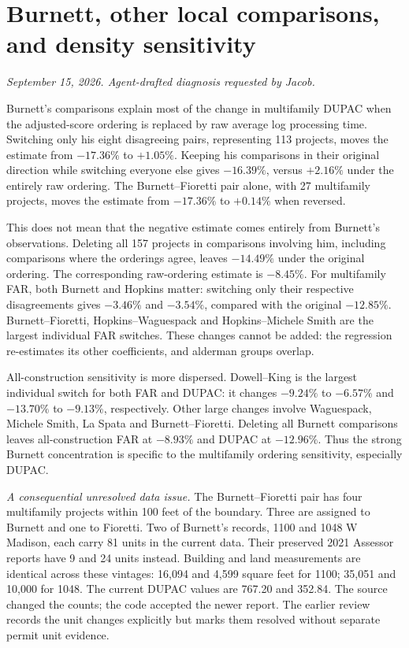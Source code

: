 \clearpage
\section*{Burnett, other local comparisons, and density sensitivity}
\textit{September 15, 2026. Agent-drafted diagnosis requested by Jacob.}

Burnett's comparisons explain most of the change in multifamily DUPAC when
the adjusted-score ordering is replaced by raw average log processing time.
Switching only his eight disagreeing pairs, representing 113 projects,
moves the estimate from $-17.36\%$ to $+1.05\%$. Keeping his comparisons
in their original direction while switching everyone else gives
$-16.39\%$, versus $+2.16\%$ under the entirely raw ordering. The
Burnett--Fioretti pair alone, with 27 multifamily projects, moves the
estimate from $-17.36\%$ to $+0.14\%$ when reversed.

This does not mean that the negative estimate comes entirely from Burnett's
observations. Deleting all 157 projects in comparisons involving him,
including comparisons where the orderings agree, leaves $-14.49\%$ under
the original ordering. The corresponding raw-ordering estimate is
$-8.45\%$. For multifamily FAR, both Burnett and Hopkins matter:
switching only their respective disagreements gives $-3.46\%$ and
$-3.54\%$, compared with the original $-12.85\%$. Burnett--Fioretti,
Hopkins--Waguespack and Hopkins--Michele Smith are the largest individual
FAR switches. These changes cannot be added: the regression re-estimates
its other coefficients, and alderman groups overlap.

All-construction sensitivity is more dispersed. Dowell--King is the
largest individual switch for both FAR and DUPAC: it changes $-9.24\%$
to $-6.57\%$ and $-13.70\%$ to $-9.13\%$, respectively. Other large
changes involve Waguespack, Michele Smith, La Spata and Burnett--Fioretti.
Deleting all Burnett comparisons leaves all-construction FAR at $-8.93\%$
and DUPAC at $-12.96\%$. Thus the strong Burnett concentration is specific
to the multifamily ordering sensitivity, especially DUPAC.

\textit{A consequential unresolved data issue.} The Burnett--Fioretti
pair has four multifamily projects within 100 feet of the boundary. Three
are assigned to Burnett and one to Fioretti. Two of Burnett's records,
1100 and 1048 W Madison, each carry 81 units in the current data. Their
preserved 2021 Assessor reports have 9 and 24 units instead. Building and
land measurements are identical across these vintages: 16,094 and 4,599
square feet for 1100; 35,051 and 10,000 for 1048. The current DUPAC values
are 767.20 and 352.84. The source changed the counts; the code accepted the
newer report. The earlier review records the unit changes explicitly but
marks them resolved without separate permit unit evidence.


